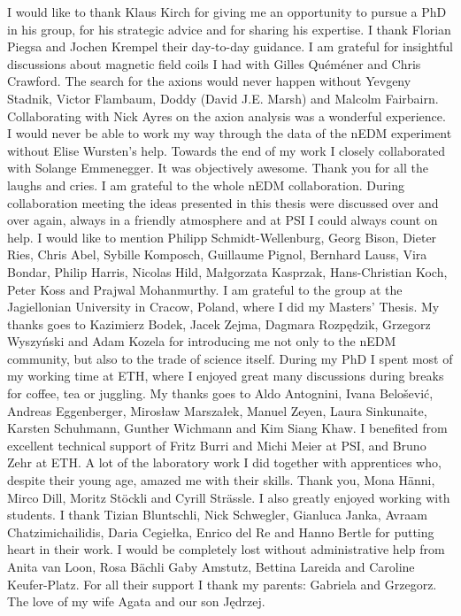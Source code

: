 I would like to thank Klaus Kirch for giving me an opportunity to pursue a PhD in his group, for his strategic advice and for sharing his expertise.
I thank Florian Piegsa and Jochen Krempel their day-to-day guidance.
I am grateful for insightful discussions about magnetic field coils I had with Gilles Quéméner and Chris Crawford. The search for the axions would never happen without Yevgeny Stadnik, Victor Flambaum, Doddy (David J.E. Marsh) and Malcolm Fairbairn. Collaborating with Nick Ayres on the axion analysis was a wonderful experience. I would never be able to work my way through the data of the nEDM experiment without Elise Wursten's help. Towards the end of my work I closely collaborated with Solange Emmenegger. It was objectively awesome. Thank you for all the laughs and cries. I am grateful to the whole nEDM collaboration. During collaboration meeting the ideas presented in this thesis were discussed over and over again, always in a friendly atmosphere and at PSI I could always count on help. I would like to mention
Philipp Schmidt-Wellenburg,
Georg Bison,
Dieter Ries,
Chris Abel,
Sybille Komposch,
Guillaume Pignol,
Bernhard Lauss,
Vira Bondar,
Philip Harris,
Nicolas Hild,
Małgorzata Kasprzak,
Hans-Christian Koch,
Peter Koss and
Prajwal Mohanmurthy.
I am grateful to the group at the Jagiellonian University in Cracow, Poland, where I did my Masters' Thesis. My thanks goes to
Kazimierz Bodek,
Jacek Zejma,
Dagmara Rozpędzik,
Grzegorz Wyszyński and
Adam Kozela
for introducing me not only to the nEDM community, but also to the trade of science itself. During my PhD I spent most of my working time at ETH, where I enjoyed great many discussions during breaks for coffee, tea or juggling. My thanks goes to
Aldo Antognini,
Ivana Belo\v{s}ević,
Andreas Eggenberger,
Mirosław Marszałek,
Manuel Zeyen,
Laura Sinkunaite,
Karsten Schuhmann,
Gunther Wichmann and
Kim Siang Khaw.
I benefited from excellent technical support of Fritz Burri and Michi Meier at PSI, and Bruno Zehr at ETH\@. A lot of the laboratory work I did together with apprentices who, despite their young age, amazed me with their skills. Thank you,
Mona Hänni,
Mirco Dill,
Moritz Stöckli and
Cyrill Strässle.
I also greatly enjoyed working with students. I thank
Tizian Bluntschli,
Nick Schwegler,
Gianluca Janka,
Avraam Chatzimichailidis,
Daria Cegiełka,
Enrico del Re and
Hanno Bertle for putting heart in their work.
I would be completely lost without administrative help from Anita van Loon, Rosa Bächli
Gaby Amstutz, Bettina Lareida and Caroline Keufer-Platz. For all their support I thank my parents: Gabriela and Grzegorz. The love of my wife Agata and our son Jędrzej. 




